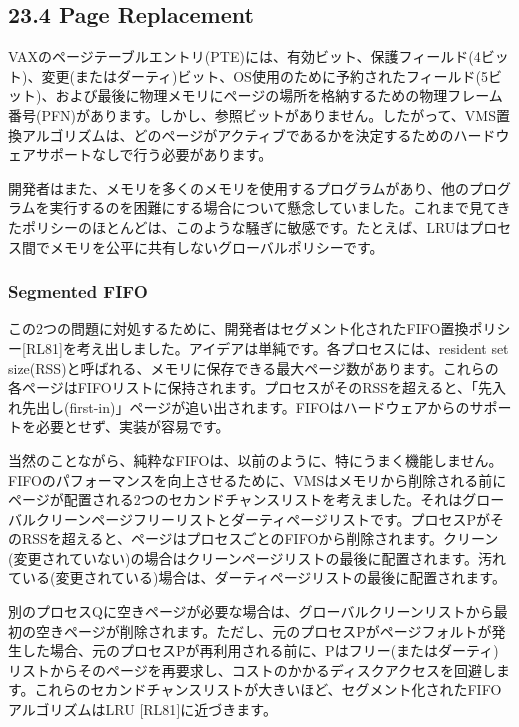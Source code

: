 \hypertarget{page-replacement}{%
\subsection*{23.4 Page Replacement}\label{page-replacement}}

VAXのページテーブルエントリ(PTE)には、有効ビット、保護フィールド(4ビット)、変更(またはダーティ)ビット、OS使用のために予約されたフィールド(5ビット)、および最後に物理メモリにページの場所を格納するための物理フレーム番号(PFN)があります。しかし、参照ビットがありません。したがって、VMS置換アルゴリズムは、どのページがアクティブであるかを決定するためのハードウェアサポートなしで行う必要があります。

開発者はまた、メモリを多くのメモリを使用するプログラムがあり、他のプログラムを実行するのを困難にする場合について懸念していました。これまで見てきたポリシーのほとんどは、このような騒ぎに敏感です。たとえば、LRUはプロセス間でメモリを公平に共有しないグローバルポリシーです。

\hypertarget{segmented-fifo}{%
\subsubsection*{Segmented FIFO}\label{segmented-fifo}}

この2つの問題に対処するために、開発者はセグメント化されたFIFO置換ポリシー{[}RL81{]}を考え出しました。アイデアは単純です。各プロセスには、resident
set
size(RSS)と呼ばれる、メモリに保存できる最大ページ数があります。これらの各ページはFIFOリストに保持されます。プロセスがそのRSSを超えると、「先入れ先出し(first-in)」ページが追い出されます。FIFOはハードウェアからのサポートを必要とせず、実装が容易です。

当然のことながら、純粋なFIFOは、以前のように、特にうまく機能しません。FIFOのパフォーマンスを向上させるために、VMSはメモリから削除される前にページが配置される2つのセカンドチャンスリストを考えました。それはグローバルクリーンページフリーリストとダーティページリストです。プロセスPがそのRSSを超えると、ページはプロセスごとのFIFOから削除されます。クリーン(変更されていない)の場合はクリーンページリストの最後に配置されます。汚れている(変更されている)場合は、ダーティページリストの最後に配置されます。

別のプロセスQに空きページが必要な場合は、グローバルクリーンリストから最初の空きページが削除されます。ただし、元のプロセスPがページフォルトが発生した場合、元のプロセスPが再利用される前に、Pはフリー(またはダーティ)リストからそのページを再要求し、コストのかかるディスクアクセスを回避します。これらのセカンドチャンスリストが大きいほど、セグメント化されたFIFOアルゴリズムはLRU
{[}RL81{]}に近づきます。

